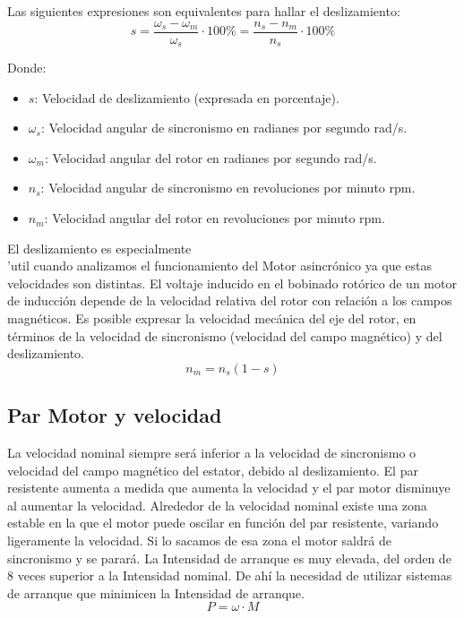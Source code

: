 \documentclass[../main]{subfiles}
\begin{document}
Las siguientes expresiones son equivalentes para hallar el deslizamiento:
\begin{equation}
s = \frac{\omega_s - \omega_m}{\omega_s} \cdot 100\% = \frac{n_s - n_m}{n_s} \cdot 100\%
\end{equation}

Donde:
\begin{itemize}
\item $s$: Velocidad de deslizamiento (expresada en porcentaje).
\item $\omega_{s}$: Velocidad angular de sincronismo en radianes por segundo \unit{rad/s}.
\item $\omega_{m}$: Velocidad angular del rotor en radianes por segundo \unit{rad/s}.
\item $n_{s}$: Velocidad angular de sincronismo en revoluciones por minuto \unit{rpm}.
\item $n_{m}$: Velocidad angular del rotor en revoluciones por minuto \unit{rpm}.
\end{itemize}

El deslizamiento es especialmente \\'util{} cuando analizamos el funcionamiento del Motor asincr\'onico{} ya que estas velocidades son distintas. El voltaje inducido en el bobinado rot\'orico{} de un motor de inducci\'on{} depende de la velocidad relativa del rotor con relaci\'on{} a los campos magn\'eticos.
Es posible expresar la velocidad mec\'anica{} del eje del rotor, en t\'erminos{} de la velocidad de sincronismo (velocidad del campo magn\'etico) y del deslizamiento.
\begin{equation}
n_{m} = n_{s}(1-s)
\end{equation}


\subsection{Par Motor y velocidad}

La velocidad nominal siempre ser\'a{} inferior a la velocidad de sincronismo o velocidad del campo magn\'etico{} del estator, debido al deslizamiento.
El par resistente aumenta a medida que aumenta la velocidad y el par motor disminuye al aumentar la velocidad.
Alrededor de la velocidad nominal existe una zona estable en la que el motor puede oscilar en funci\'on{} del par resistente, variando ligeramente la velocidad. Si lo sacamos de esa zona el motor saldr\'a{} de sincronismo y se parar\'a.
La Intensidad de arranque es muy elevada, del orden de 8 veces superior a la Intensidad nominal.
De ah\'i{} la necesidad de utilizar sistemas de arranque que minimicen la Intensidad de arranque.
\begin{equation}
P = \omega \cdot M
\end{equation}
\end{document}
